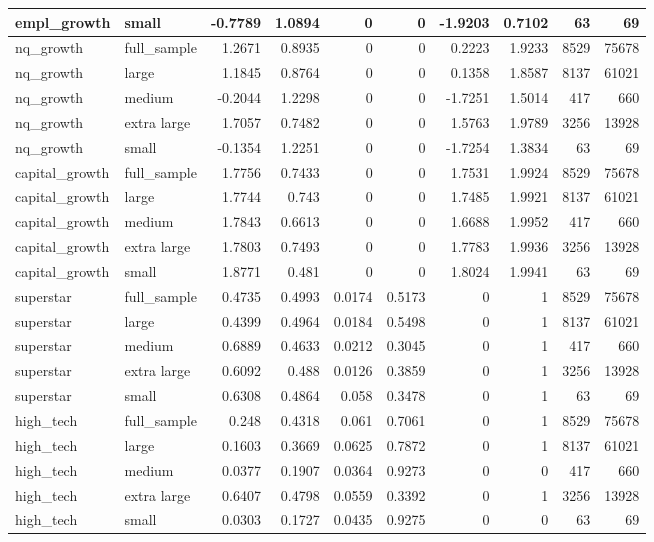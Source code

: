 \begin{table}[h]
\begin{tabular}{l lr r r r r r r r}
empl\_growth & small & -0.7789 & 1.0894 & 0 & 0 & -1.9203 & 0.7102 & 63&69\\
\hline
nq\_growth & full\_sample & 1.2671 & 0.8935 & 0 & 0 & 0.2223 & 1.9233 & 8529&75678\\
nq\_growth & large & 1.1845 & 0.8764 & 0 & 0 & 0.1358 & 1.8587 & 8137&61021\\
nq\_growth & medium & -0.2044 & 1.2298 & 0 & 0 & -1.7251 & 1.5014 & 417&660\\
nq\_growth & extra large & 1.7057 & 0.7482 & 0 & 0 & 1.5763 & 1.9789 & 3256&13928\\
nq\_growth & small & -0.1354 & 1.2251 & 0 & 0 & -1.7254 & 1.3834 & 63&69\\
\hline
capital\_growth & full\_sample & 1.7756 & 0.7433 & 0 & 0 & 1.7531 & 1.9924 & 8529&75678\\
capital\_growth & large & 1.7744 & 0.743 & 0 & 0 & 1.7485 & 1.9921 & 8137&61021\\
capital\_growth & medium & 1.7843 & 0.6613 & 0 & 0 & 1.6688 & 1.9952 & 417&660\\
capital\_growth & extra large & 1.7803 & 0.7493 & 0 & 0 & 1.7783 & 1.9936 & 3256&13928\\
capital\_growth & small & 1.8771 & 0.481 & 0 & 0 & 1.8024 & 1.9941 & 63&69\\
\hline
superstar & full\_sample & 0.4735 & 0.4993 & 0.0174 & 0.5173 & 0 & 1 & 8529&75678\\
superstar & large & 0.4399 & 0.4964 & 0.0184 & 0.5498 & 0 & 1 & 8137&61021\\
superstar & medium & 0.6889 & 0.4633 & 0.0212 & 0.3045 & 0 & 1 & 417&660\\
superstar & extra large & 0.6092 & 0.488 & 0.0126 & 0.3859 & 0 & 1 & 3256&13928\\
superstar & small & 0.6308 & 0.4864 & 0.058 & 0.3478 & 0 & 1 & 63&69\\
\hline
high\_tech & full\_sample & 0.248 & 0.4318 & 0.061 & 0.7061 & 0 & 1 & 8529&75678\\
high\_tech & large & 0.1603 & 0.3669 & 0.0625 & 0.7872 & 0 & 1 & 8137&61021\\
high\_tech & medium & 0.0377 & 0.1907 & 0.0364 & 0.9273 & 0 & 0 & 417&660\\
high\_tech & extra large & 0.6407 & 0.4798 & 0.0559 & 0.3392 & 0 & 1 & 3256&13928\\
high\_tech & small & 0.0303 & 0.1727 & 0.0435 & 0.9275 & 0 & 0 & 63&69\\
\hline
\hline
\end{tabular}
\end{table}